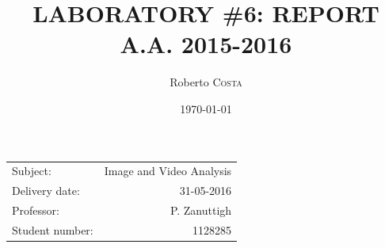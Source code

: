 \documentclass[11pt]{article}
\title{LABORATORY \#6: REPORT \\ A.A. 2015-2016}
\author{Roberto \textsc{Costa}} %
\date{\today}
\begin{document}
\maketitle
\begin{center}
\begin{tabular}{l r}
Subject: & Image and Video Analysis\\
Delivery date: & 31-05-2016 \\ 
Professor: & P. Zanuttigh \\
Student number: & 1128285
\end{tabular}
\end{center}


\end{document}
